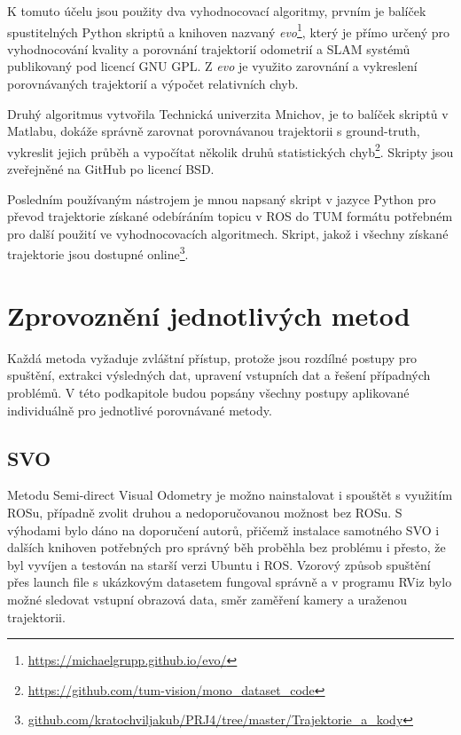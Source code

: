 \documentclass[12pt,a4paper]{report}
\begin{document}
K tomuto účelu jsou použity dva vyhodnocovací algoritmy, prvním je balíček spustitelných Python skriptů a knihoven nazvaný \textit{evo}\footnote{\url{https://michaelgrupp.github.io/evo/}}, který je přímo určený pro vyhodnocování kvality a porovnání trajektorií odometrií a SLAM systémů publikovaný pod licencí GNU GPL. Z \textit{evo} je využito zarovnání a vykreslení porovnávaných trajektorií a výpočet relativních chyb.

Druhý algoritmus vytvořila Technická univerzita Mnichov, je to balíček skriptů v Matlabu, dokáže správně zarovnat porovnávanou trajektorii s ground-truth, vykreslit jejich průběh a vypočítat několik druhů statistických chyb\footnote{\url{https://github.com/tum-vision/mono_dataset_code}}. Skripty jsou zveřejněné na GitHub po licencí BSD.

Posledním používaným nástrojem je mnou napsaný skript v jazyce Python pro převod trajektorie získané odebíráním topicu v ROS do TUM formátu potřebném pro další použití ve vyhodnocovacích algoritmech. Skript, jakož i všechny získané trajektorie jsou dostupné online\footnote{\url{github.com/kratochviljakub/PRJ4/tree/master/Trajektorie_a_kody}}.

\section{Zprovoznění jednotlivých metod}
Každá metoda vyžaduje zvláštní přístup, protože jsou rozdílné postupy pro spuštění, extrakci výsledných dat, upravení vstupních dat a řešení případných problémů. V této podkapitole budou popsány všechny postupy aplikované individuálně pro jednotlivé porovnávané metody.

\subsection{SVO}
Metodu Semi-direct Visual Odometry je možno nainstalovat i spouštět s využitím ROSu, případně zvolit druhou a nedoporučovanou možnost bez ROSu. S výhodami bylo dáno na doporučení autorů, přičemž instalace samotného SVO i dalších knihoven potřebných pro správný běh proběhla bez problému i přesto, že byl vyvíjen a testován na starší verzi Ubuntu i ROS. Vzorový způsob spuštění přes launch file s ukázkovým datasetem fungoval správně a v programu RViz bylo možné sledovat vstupní obrazová data, směr zaměření kamery a uraženou trajektorii. 
\end{document}
